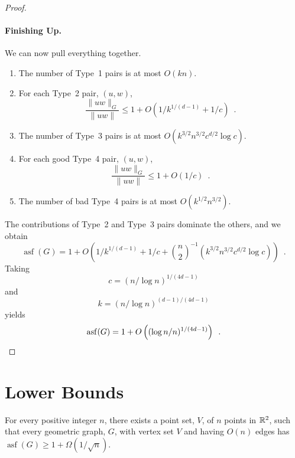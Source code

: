 \documentclass{patmorin}
\DeclareMathOperator{\asf}{asf}
\begin{document}
\begin{proof}
  \paragraph{Finishing Up.}
  We can now pull everything together.
  \begin{enumerate}
    \item The number of Type~1 pairs is at most $O(kn)$.
    \item For each Type~2 pair, $(u,w)$, 
    \[
      \frac{\|uw\|_G}{\|uw\|}\le 1+ O(1/k^{1/(d-1)}+1/c) \enspace .
    \]
    \item The number of Type~3 pairs is at most
      $O(k^{3/2}n^{3/2}c^{d/2}\log c)$.
    \item For each good Type~4 pair, $(u,w)$, 
    \[
      \frac{\|uw\|_G}{\|uw\|}\le 1+ O(1/c) \enspace .
    \]
    \item The number of bad Type~4 pairs is at most 
       $O(k^{1/2}n^{3/2})$.
  \end{enumerate}
  The contributions of Type~2 and Type~3 pairs dominate the others, and
  we obtain
  \[
     \asf(G) = 1 + O\left(1/k^{1/(d-1)} + 1/c 
       + \binom{n}{2}^{-1}\left(k^{3/2}n^{3/2}c^{d/2}\log c\right)\right) \enspace .
  \]
  Taking 
  \[ 
       c = (n/\log n)^{1/(4d-1)}
  \]
  and
  \[
       k = (n/\log n)^{(d-1)/(4d-1)} 
  \]
  yields
  \[
     \asf(G) = 1+ O\left((\log n/n)^{1/(4d-1)}\right) \enspace . \qedhere
  \]
\end{proof}



\section{Lower Bounds}

\begin{thm}
  For every positive integer $n$, there exists a point set, $V$, of $n$
  points in $\mathbb{R}^2$, such that every geometric graph, $G$, with vertex
  set $V$ and having $O(n)$ edges has $\asf(G)\ge 1 + \Omega(1/\sqrt{n})$.
\end{thm}
\end{document}
